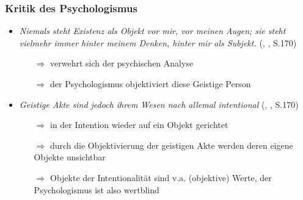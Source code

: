 \documentclass{beamer}
\begin{document}
\begin{frame}
\frametitle{Kritik des Psychologismus}

  \begin{itemize}
  \setlength{\itemsep}{10pt}
    
    \item \textit{\glqq{}Niemals steht Existenz als Objekt vor mir, vor meinen Augen; sie steht vielmehr immer hinter meinem Denken, hinter mir als Subjekt.\grqq{}} \footnotesize(\citeauthor{Frankl1996}, \citeyear{Frankl1996}, S.170)\normalsize
    \begin{itemize}
      \item[$\Rightarrow$] verwehrt sich der psychischen Analyse
      \item[$\Rightarrow$] der Psychologismus objektiviert diese Geistige Person
    \end{itemize}
    
    \pause    
    
    \item \textit{\glqq{}Geistige Akte sind jedoch ihrem Wesen nach allemal intentional\grqq{}} \footnotesize(\citeauthor{Frankl1996}, \citeyear{Frankl1996}, S.170)\normalsize
    \begin{itemize}
      \item[$\Rightarrow$] in der Intention wieder auf ein Objekt gerichtet
      \item[$\Rightarrow$] durch die Objektivierung der geistigen Akte werden deren eigene Objekte unsichtbar
      \item[$\Rightarrow$] Objekte der Intentionalität sind v.a. (objektive) Werte, der Psychologismus ist also wertblind
    \end{itemize}
    
  \end{itemize}

\end{frame}
\end{document}
